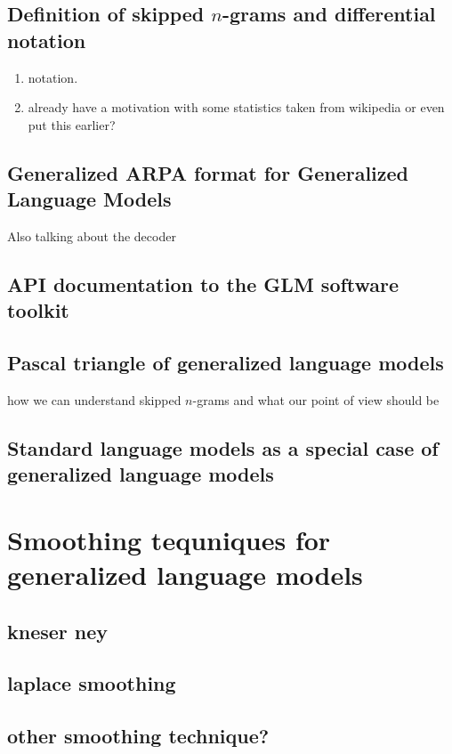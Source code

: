 \documentclass[•]{book}
\begin{document}
\section{Definition of skipped $n$-grams and differential notation}
\begin{enumerate}
\item notation. 
\item already have a motivation with some statistics taken from wikipedia or even put this earlier?
\end{enumerate}


\section{Generalized ARPA format for Generalized Language Models}
Also talking about the decoder
\section{API documentation to the GLM software toolkit}

\section{Pascal triangle of generalized language models}
how we can understand skipped $n$-grams and what our point of view should be

\section{Standard language models as a special case of generalized language models}



\chapter{Smoothing tequniques for generalized language models}
 
\section{kneser ney}
\section{laplace smoothing}
\section{other smoothing technique?}
\end{document}
